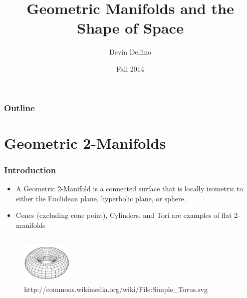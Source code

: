 \documentclass[13pt]{beamer}
\title{Geometric Manifolds and the Shape of Space}
\author{Devin Delfino}
\institute{MATH 331: Geometry}
\date{Fall 2014}
\begin{document}
\frame{\titlepage}

\begin{frame}
\frametitle{Outline}
\tableofcontents
\end{frame}

\section{Geometric 2-Manifolds} %
\begin{frame}
\frametitle{Introduction}
	\begin{itemize}
		\item A \alert{Geometric 2-Manifold} is a connected surface that is locally isometric to either the Euclidean plane, hyperbolic plane, or sphere.
		\item Cones (excluding cone point), Cylinders, and Tori are examples of flat 2-manifolds
	\end{itemize}
	\begin{columns}[r] %
     \centering
      \begin{figure}
        \includegraphics[height=2cm]{./img/torus}
        \caption{http://commons.wikimedia.org/wiki/File:Simple\_Torus.svg}
      \end{figure}
  \end{columns}
\end{frame}
\end{document}
